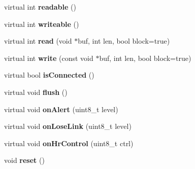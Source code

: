 \begin{DoxyCompactItemize}
\item 
\hypertarget{classble_serial_a59dca8e3e2d6945a699347f4c4708fd4}{virtual int {\bfseries readable} ()}\label{classble_serial_a59dca8e3e2d6945a699347f4c4708fd4}

\item 
\hypertarget{classble_serial_ac42a8f805e6784e0fa2064270b5288a1}{virtual int {\bfseries writeable} ()}\label{classble_serial_ac42a8f805e6784e0fa2064270b5288a1}

\item 
\hypertarget{classble_serial_a186e09706d9b6e58a6213ac0b6a220ad}{virtual int {\bfseries read} (void $\ast$buf, int len, bool block=true)}\label{classble_serial_a186e09706d9b6e58a6213ac0b6a220ad}

\item 
\hypertarget{classble_serial_ab9d147e7dcb9436f390f2ad29d539930}{virtual int {\bfseries write} (const void $\ast$buf, int len, bool block=true)}\label{classble_serial_ab9d147e7dcb9436f390f2ad29d539930}

\item 
\hypertarget{classble_serial_aebfde0d9a7583cb641ac60f02df7cd77}{virtual bool {\bfseries is\-Connected} ()}\label{classble_serial_aebfde0d9a7583cb641ac60f02df7cd77}

\item 
\hypertarget{classble_serial_ad41b78cc1b0fc02ce65248147b32ffa8}{virtual void {\bfseries flush} ()}\label{classble_serial_ad41b78cc1b0fc02ce65248147b32ffa8}

\item 
\hypertarget{classble_serial_a86c84a983b3828566945439cd57d6c1f}{virtual void {\bfseries on\-Alert} (uint8\-\_\-t level)}\label{classble_serial_a86c84a983b3828566945439cd57d6c1f}

\item 
\hypertarget{classble_serial_a81eef799a18ac0bbbce3154ce804803c}{virtual void {\bfseries on\-Lose\-Link} (uint8\-\_\-t level)}\label{classble_serial_a81eef799a18ac0bbbce3154ce804803c}

\item 
\hypertarget{classble_serial_a30364c8347fb1a2fd11b4265dc8d7bd9}{virtual void {\bfseries on\-Hr\-Control} (uint8\-\_\-t ctrl)}\label{classble_serial_a30364c8347fb1a2fd11b4265dc8d7bd9}

\item 
\hypertarget{classble_serial_affee65f4e797608b6e6b7e325246484e}{void {\bfseries reset} ()}\label{classble_serial_affee65f4e797608b6e6b7e325246484e}


\end{DoxyCompactItemize}
